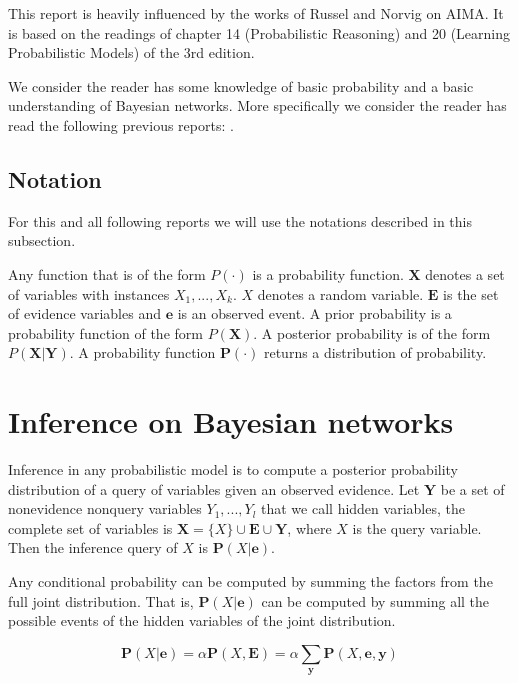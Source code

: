 \documentclass[a4paper,10pt]{article}
\theoremstyle{plain}
\begin{document}
This report is heavily influenced by the works of Russel and Norvig on AIMA\cite{aima}. It is based
on the readings of chapter 14 (Probabilistic Reasoning) and 20 (Learning Probabilistic Models) of
the 3rd edition.

We consider the reader has some knowledge of basic probability and a basic understanding of
Bayesian networks. More specifically we consider the reader has read the following previous
reports: \cite{project-def, report-1, report-2, report-5, report-8, report-9}.

\subsection{Notation}

For this and all following reports we will use the notations described in this subsection.

Any function that is of the form $P(\cdot)$ is a probability function. $\mathbf{X}$ denotes a set
of variables with instances $X_1,...,X_k$. $X$ denotes a random variable. $\mathbf{E}$ is the set
of evidence variables and $\mathbf{e}$ is an observed event. A prior probability is a probability
function of the form $P(\mathbf{X})$. A posterior probability is of the form $P(\mathbf{X}|\mathbf{
Y})$. A probability function $\mathbf{P}(\cdot)$ returns a distribution of probability.

\section{Inference on Bayesian networks}

Inference in any probabilistic model is to compute a posterior probability distribution of a query
of variables given an observed evidence. Let $\mathbf{Y}$ be a set of nonevidence nonquery
variables $Y_1,...,Y_l$ that we call hidden variables, the complete set of variables is $\mathbf{X}
= \{X\} \cup \mathbf{E} \cup \mathbf{Y}$, where $X$ is the query variable. Then the inference query
of $X$ is $\mathbf{P}(X|\mathbf{e})$.

Any conditional probability can be computed by summing the factors from the full joint
distribution. That is, $\mathbf{P}(X|\mathbf{e})$ can be computed by summing all the possible
events of the hidden variables of the joint distribution.

\begin{equation*}
  \mathbf{P}(X|\mathbf{e}) = \alpha \mathbf{P}(X, \mathbf{E}) = \alpha \sum_\mathbf{y} \mathbf{P}(
  X, \mathbf{e}, \mathbf{y})
\end{equation*}

\newpage

\printbibliography
\end{document}
